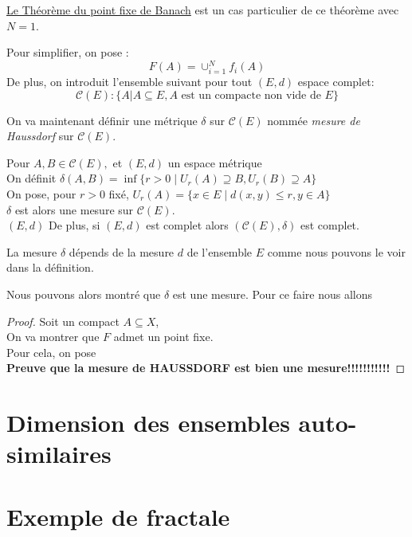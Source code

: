 \documentclass[a4paper, 12pt]{report}
\begin{document}
		\begin{remark*}
		\hyperref[ThmPtFixe]{Le Théorème du point fixe de Banach} est un cas particulier de ce théorème avec $N=1$.
		\end{remark*}
		
		Pour simplifier, on pose :
		\begin{equation*}
			F(A)=\cup^N_{i=1}f_i(A)
		\end{equation*}
		De plus, on introduit l'ensemble suivant pour tout $(E,d)$ espace complet:
		\begin{equation*}
			\mathcal{C}(E) : \{A|A\subseteq E, A\textrm{ est un compacte non vide de }E\}
		\end{equation*}
		
		On va maintenant définir une métrique $\delta$ sur $\mathcal{C}(E)$ nommée \textit{mesure de Haussdorf} sur $\mathcal{C}(E)$.
		\begin{prop}
			\label{mesHauss}
			Pour $A,B\in\mathcal{C}(E),$ et $(E,d)$ un espace métrique\\
			On définit $\delta(A,B)=\inf\{r>0\mid U_r(A)\supseteq B, U_r(B)\supseteq A\}$\\
			On pose, pour $r>0$ fixé, $U_r(A)=\{x\in E\mid d(x,y)\leq r,y\in A\}$\\
			$\delta$ est alors une mesure sur $\mathcal{C}(E)$.\\$(E,d)$
			De plus, si $(E,d)$ est complet alors $(\mathcal{C}(E),\delta)$ est complet.
		\end{prop}
		\begin{remark*}
			La mesure $\delta$ dépends de la mesure $d$ de l'ensemble $E$ comme nous pouvons le voir dans la définition. 
		\end{remark*}

		
		Nous pouvons alors montré que $\delta$ est une mesure. Pour ce faire nous allons 
		\begin{proof}
			Soit un compact $A\subseteq X$,\\
			On va montrer que $F$ admet un point fixe.\\
			Pour cela, on pose \\
			\textbf{Preuve que la mesure de HAUSSDORF est bien une mesure!!!!!!!!!!!}
		\end{proof}
	


	\chapter{\bf Dimension des ensembles auto-similaires}
	
	\chapter{\bf Exemple de fractale}
\end{document}
